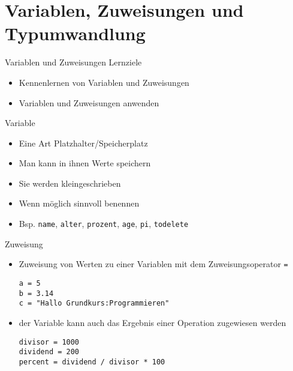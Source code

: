 \section{Variablen, Zuweisungen und Typumwandlung}

\begin{frame}[fragile]{Variablen und Zuweisungen}
Lernziele
\begin{itemize}
	\item Kennenlernen von Variablen und Zuweisungen
	\item Variablen und Zuweisungen anwenden

\end{itemize}
\end{frame}

\begin{frame}[fragile]{Variable}
\begin{itemize}
	\item Eine Art Platzhalter/Speicherplatz
	\item Man kann in ihnen Werte speichern
	\item Sie werden kleingeschrieben
	\item Wenn möglich sinnvoll benennen
	\item Bsp. \texttt{name}, \texttt{alter}, \texttt{prozent}, \texttt{age}, \texttt{pi}, \texttt{todelete}
	
\end{itemize}
\end{frame}


\begin{frame}[fragile]{Zuweisung}
\begin{itemize}
\item Zuweisung von Werten zu einer Variablen mit dem Zuweisungsoperator \texttt{=}
\begin{lstlisting}
a = 5
b = 3.14 
c = "Hallo Grundkurs:Programmieren"
\end{lstlisting}
\item der Variable kann auch das Ergebnis einer Operation zugewiesen werden
\begin{lstlisting}
divisor = 1000
dividend = 200
percent = dividend / divisor * 100
\end{lstlisting}

\end{itemize}
\end{frame}



